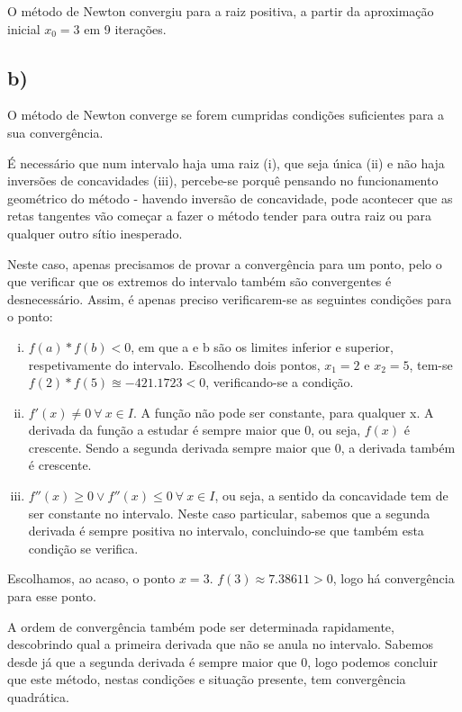 \documentclass[a4paper, 18pt]{article}
\begin{document}
	\par
	O método de Newton convergiu para a raiz positiva, a partir da aproximação inicial $x_0 = 3$ em 9 iterações.

\subsection*{b)}
	\par
	O método de Newton converge se forem cumpridas condições suficientes para a sua convergência.

	\par
	É necessário que num intervalo haja uma raiz (i), que seja única (ii) e não haja inversões de concavidades (iii),
	percebe-se porquê pensando no funcionamento geométrico do método - havendo inversão de concavidade, pode
	acontecer que as retas tangentes vão começar a fazer o método tender para outra raiz ou para qualquer outro sítio inesperado.

	Neste caso, apenas precisamos de provar a convergência para um ponto, pelo o que verificar que os extremos do intervalo também são convergentes é desnecessário. Assim, é apenas preciso verificarem-se as seguintes condições para o ponto:

	\begin{enumerate}[i)]
	\item $f(a)*f(b) < 0$, em que a e b são os limites inferior e superior, respetivamente do intervalo.
	Escolhendo dois pontos, $x_1 = 2$ e $x_2 = 5$, tem-se $f(2) * f(5) \approxeq -421.1723 < 0 $, verificando-se a condição.

	\item $f'(x) \neq 0 \> \forall \> x \in I$. A função não pode ser constante, para qualquer x.
	A derivada da função a estudar é sempre maior que 0, ou seja, $f(x)$ é crescente. Sendo a segunda derivada sempre maior que 0, a derivada também é crescente.

	\item $f''(x) \geqslant 0 \vee f''(x) \leqslant 0 \> \forall \> x \in I$, ou seja, a sentido da concavidade tem de ser constante no intervalo.
	Neste caso particular, sabemos que a segunda derivada é sempre positiva no intervalo, concluindo-se que também esta condição se verifica.
	\end{enumerate}

	Escolhamos, ao acaso, o ponto $x = 3$. $f(3) \approx 7.38611 > 0$, logo há convergência para esse ponto.

	A ordem de convergência também pode ser determinada rapidamente, descobrindo qual a primeira derivada que não se anula no intervalo. Sabemos desde já que a segunda derivada é sempre maior que 0, logo podemos concluir que este método, nestas condições e situação presente, tem convergência quadrática.
\end{document}
